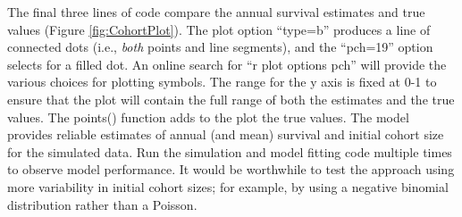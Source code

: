 \documentclass[
]{krantz}
\makeatletter
\newenvironment{Shaded}{\begin{snugshade}}{\end{snugshade}}
\newcommand{\AttributeTok}[1]{\textcolor[rgb]{0.27,0.27,0.27}{#1}}
\newcommand{\CommentTok}[1]{\textcolor[rgb]{0.37,0.37,0.37}{\textit{#1}}}
\newcommand{\DecValTok}[1]{\textcolor[rgb]{0.06,0.06,0.06}{#1}}
\newcommand{\FunctionTok}[1]{\textcolor[rgb]{0.27,0.27,0.27}{\textbf{#1}}}
\newcommand{\NormalTok}[1]{#1}
\newcommand{\OtherTok}[1]{\textcolor[rgb]{0.37,0.37,0.37}{#1}}
\newcommand{\SpecialCharTok}[1]{\textcolor[rgb]{0.43,0.43,0.43}{\textbf{#1}}}
\newcommand{\StringTok}[1]{\textcolor[rgb]{0.5,0.5,0.5}{#1}}
\newenvironment{kframe}{%
\medskip{}
\setlength{\fboxsep}{.8em}
 \def\at@end@of@kframe{}%
 \ifinner\ifhmode%
  \def\at@end@of@kframe{\end{minipage}}%
  \begin{minipage}{\columnwidth}%
 \fi\fi%
 \def\FrameCommand##1{\hskip\@totalleftmargin \hskip-\fboxsep
 \colorbox{shadecolor}{##1}\hskip-\fboxsep
     \hskip-\linewidth \hskip-\@totalleftmargin \hskip\columnwidth}%
 \MakeFramed {\advance\hsize-\width
   \@totalleftmargin\z@ \linewidth\hsize
   \@setminipage}}%
 {\par\unskip\endMakeFramed%
 \at@end@of@kframe}
\renewenvironment{Shaded}{\begin{kframe}}{\end{kframe}}
\makeatother
\begin{document}
\begin{Shaded}
\end{Shaded}

The final three lines of code compare the annual survival estimates and true values (Figure \ref{fig:CohortPlot}). The plot option ``type=b'' produces a line of connected dots (i.e., \emph{both} points and line segments), and the ``pch=19'' option selects for a filled dot. An online search for ``r plot options pch'' will provide the various choices for plotting symbols. The range for the y axis is fixed at 0-1 to ensure that the plot will contain the full range of both the estimates and the true values. The points() function adds to the plot the true values. The model provides reliable estimates of annual (and mean) survival and initial cohort size for the simulated data. Run the simulation and model fitting code multiple times to observe model performance. It would be worthwhile to test the approach using more variability in initial cohort sizes; for example, by using a negative binomial distribution rather than a Poisson.
\end{document}
